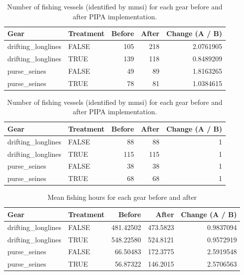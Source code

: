 \documentclass[]{article}
\begin{document}
\begin{table}[H]

\caption{\label{tab:unnamed-chunk-4}\label{tab:baci_n}Number of fishing vessels (identified by mmsi) for each gear before and after PIPA implementation.}
\centering
\begin{tabular}[t]{llrrr}
\toprule
Gear & Treatment & Before & After & Change (A / B)\\
\midrule
drifting\_longlines & FALSE & 105 & 218 & 2.0761905\\
drifting\_longlines & TRUE & 139 & 118 & 0.8489209\\
purse\_seines & FALSE & 49 & 89 & 1.8163265\\
purse\_seines & TRUE & 78 & 81 & 1.0384615\\
\bottomrule
\end{tabular}
\end{table}

\begin{table}[H]

\caption{\label{tab:unnamed-chunk-5}\label{tab:baci_n_s}Number of fishing vessels (identified by mmsi) for each gear before and after PIPA implementation.}
\centering
\begin{tabular}[t]{llrrr}
\toprule
Gear & Treatment & Before & After & Change (A / B)\\
\midrule
drifting\_longlines & FALSE & 88 & 88 & 1\\
drifting\_longlines & TRUE & 115 & 115 & 1\\
purse\_seines & FALSE & 38 & 38 & 1\\
purse\_seines & TRUE & 68 & 68 & 1\\
\bottomrule
\end{tabular}
\end{table}

\begin{table}[H]

\caption{\label{tab:unnamed-chunk-6}\label{tab:baci_h}Mean fishing hours for each gear before and after}
\centering
\begin{tabular}[t]{llrrr}
\toprule
Gear & Treatment & Before & After & Change (A / B)\\
\midrule
drifting\_longlines & FALSE & 481.42502 & 473.5823 & 0.9837094\\
drifting\_longlines & TRUE & 548.22580 & 524.8121 & 0.9572919\\
purse\_seines & FALSE & 66.50483 & 172.3775 & 2.5919548\\
purse\_seines & TRUE & 56.87322 & 146.2015 & 2.5706563\\
\bottomrule
\end{tabular}
\end{table}
\end{document}
